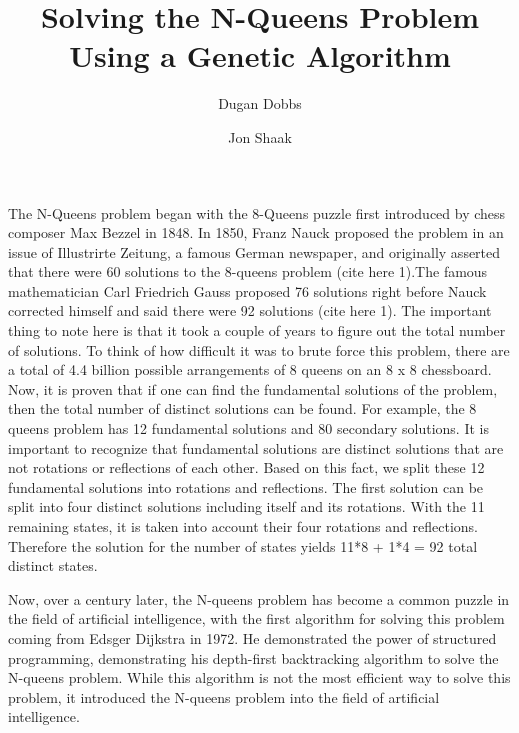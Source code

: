 \documentclass{vgtc}                          %
\title{Solving the N-Queens Problem Using a Genetic Algorithm}
\author[1]{\small Dugan Dobbs}
\author[1]{\small Jon Shaak}
\affil[1]{\footnotesize Department of Computer Science, Texas A\&M University, Corpus Christi, TX 78412, USA}
\begin{document}

\maketitle
The N-Queens problem began with the 8-Queens puzzle first introduced by chess composer Max Bezzel in 1848. In 1850, Franz Nauck proposed the problem in an issue of Illustrirte Zeitung, a famous German newspaper, and originally asserted that there were 60 solutions to the 8-queens problem (cite here 1).The famous mathematician Carl Friedrich Gauss proposed 76 solutions right before Nauck corrected himself and said there were 92 solutions (cite here 1). The important thing to note here is that it took a couple of years to figure out the total number of solutions. To think of how difficult it was to brute force this problem, there are a total of 4.4 billion possible arrangements of 8 queens on an 8 x 8 chessboard. Now, it is proven that if one can find the fundamental solutions of the problem, then the total number of distinct solutions can be found. For example, the 8 queens problem has 12 fundamental solutions and 80 secondary solutions. It is important to recognize that fundamental solutions are distinct solutions that are not rotations or reflections of each other. Based on this fact, we split these 12 fundamental solutions into rotations and reflections. The first solution can be split into four distinct solutions including itself and its rotations. With the 11 remaining states, it is taken into account their four rotations and reflections. Therefore the solution for the number of states yields 11*8 + 1*4 = 92 total distinct states.\par 
	Now, over a century later, the N-queens problem has become a common puzzle in the field of artificial intelligence, with the first algorithm for solving this problem coming from Edsger Dijkstra in 1972. He demonstrated the power of structured programming, demonstrating his depth-first backtracking algorithm to solve the N-queens problem. While this algorithm is not the most efficient way to solve this problem, it introduced the N-queens problem into the field of artificial intelligence. 
    
    
\end{document}
